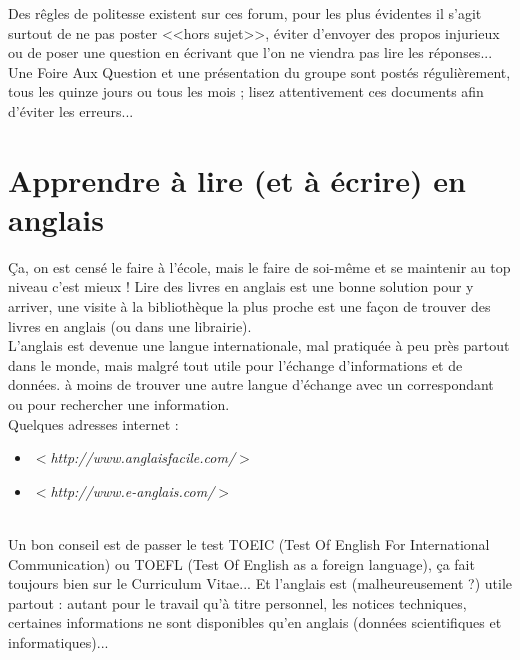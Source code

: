 \documentclass[11pt,twoside,a4paper]{article}
\begin{document}
			Des r{\^e}gles de politesse existent sur ces forum, pour les plus {\'e}videntes il s'agit surtout de ne pas poster <<hors sujet>>, {\'e}viter d'envoyer des propos injurieux ou de poser une question en {\'e}crivant que l'on ne viendra pas lire les r{\'e}ponses... Une Foire Aux Question et une pr{\'e}sentation du groupe sont post{\'e}s r{\'e}guli{\`e}rement, tous les quinze jours ou tous les mois ; lisez attentivement ces documents afin d'{\'e}viter les erreurs...~\\

\section{Apprendre {\`a} lire (et {\`a} {\'e}crire) en anglais}
		\c{C}a, on est cens{\'e} le faire {\`a} l'{\'e}cole, mais le faire de soi-m{\^e}me et se maintenir au top niveau c'est mieux ! Lire des livres en anglais est une bonne solution pour y arriver, une visite {\`a} la biblioth{\`e}que la plus proche est une fa\c{c}on de trouver des livres en anglais (ou dans une librairie). ~\\

	L'anglais est devenue une langue internationale, mal pratiqu{\'e}e {\`a} peu pr{\`e}s partout dans le monde, mais malgr{\'e} tout utile pour l'{\'e}change d'informations et de donn{\'e}es. {\`a} moins de trouver une autre langue d'{\'e}change avec un correspondant ou pour rechercher une information. ~\\

	Quelques adresses internet : 
	\begin{itemize}
		\item $<$\emph{http://www.anglaisfacile.com/}$>$
		\item $<$\emph{http://www.e-anglais.com/}$>$
	\end{itemize}~\\

	Un bon conseil est de passer le test TOEIC (Test Of English For International Communication) ou TOEFL (Test Of English as a foreign language), \c{c}a fait toujours bien sur le Curriculum Vitae... Et l'anglais est (malheureusement ?) utile partout : autant pour le travail qu'{\`a} titre personnel, les notices techniques, certaines informations ne sont disponibles qu'en anglais (donn{\'e}es scientifiques et informatiques)... %
\end{document}
